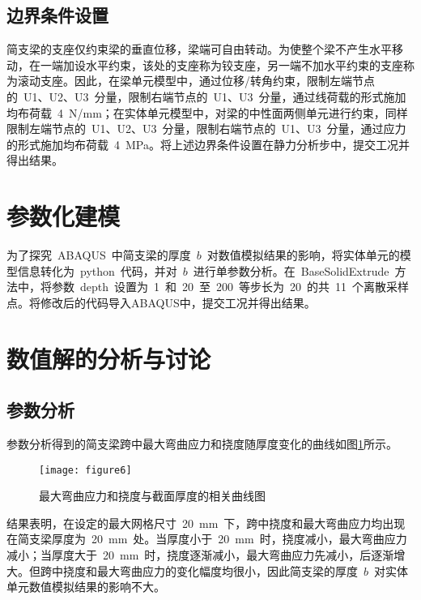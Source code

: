 \subsection{边界条件设置}
简支梁的支座仅约束梁的垂直位移，梁端可自由转动。为使整个梁不产生水平移动，在一端加设水平约束，该处的支座称为铰支座，另一端不加水平约束的支座称为滚动支座。因此，在梁单元模型中，通过位移/转角约束，限制左端节点的~U1、U2、U3~分量，限制右端节点的~U1、U3~分量\cite{gajdosova2018influence}，通过线荷载的形式施加均布荷载~4~N/mm；在实体单元模型中，对梁的中性面两侧单元进行约束\cite{JGXB201402012}，同样限制左端节点的~U1、U2、U3~分量，限制右端节点的~U1、U3~分量，通过应力的形式施加均布荷载~4~MPa。将上述边界条件设置在静力分析步中，提交工况并得出结果。
\section{参数化建模}
为了探究~ABAQUS~中简支梁的厚度~$b$~对数值模拟结果的影响，将实体单元的模型信息转化为~python~代码，并对~$b$~进行单参数分析\cite{radon2015study,liu2016review}。在~BaseSolidExtrude~方法中，将参数~depth~设置为~1~和~20~至~200~等步长为~20~的共~11~个离散采样点\cite{fu2019recent}。将修改后的代码导入ABAQUS中，提交工况并得出结果。
\section{数值解的分析与讨论}
\subsection{参数分析}
参数分析得到的简支梁跨中最大弯曲应力和挠度随厚度变化的曲线如图\ref{fig:para}所示。
\begin{figure}[htbp]
    \centering
	\texttt{[image: figure6]}
    \caption{最大弯曲应力和挠度与截面厚度的相关曲线图}
    \label{fig:para}
\end{figure}
结果表明，在设定的最大网格尺寸~20~mm~下，跨中挠度和最大弯曲应力均出现在简支梁厚度为~20~mm~处。当厚度小于~20~mm~时，挠度减小，最大弯曲应力减小；当厚度大于~20~mm~时，挠度逐渐减小，最大弯曲应力先减小，后逐渐增大。但跨中挠度和最大弯曲应力的变化幅度均很小，因此简支梁的厚度~$b$~对实体单元数值模拟结果的影响不大。

